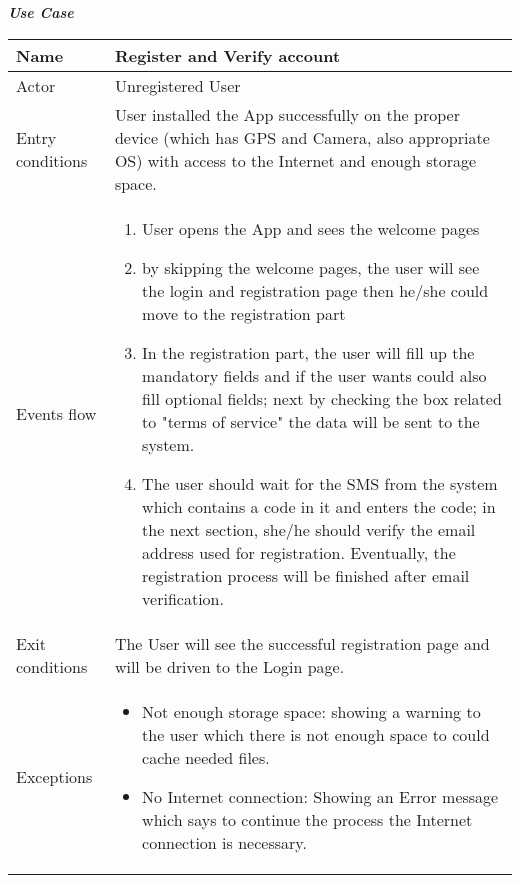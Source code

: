 

\begin{table}[H]
\begin{flushleft}\emph{\textbf{Use Case}}\end{flushleft}
\footnotesize
\centering
\settowidth{}
\setlength\extrarowheight{2pt}
\begin{tabulary}{\textwidth}{|J|J|}
\hline
Name             & Register and Verify account \\
\hline 
Actor            & Unregistered User \\
\hline 
Entry conditions & User installed the App successfully on the proper device (which has GPS and Camera, also appropriate OS) with access to the Internet and enough storage space.\\
\hline 
Events flow      & 
\begin{minipage}[t]{0.6\textwidth}
\begin{enumerate} 
\item User opens the App and sees the welcome pages 
\item by skipping the welcome pages, the user will see the login and registration page then he/she could move to the registration part
\item In the registration part, the user will fill up the mandatory fields and if the user wants could also   fill optional fields; next by checking the box related to "terms of service" the data will be sent to the system.
\item The user should wait for the SMS from the system which contains a code in it and enters the code; in the next section, she/he should verify the email address used for registration. Eventually, the registration process will be finished after email verification.
\end{enumerate}
\end{minipage}\\
\hline
Exit conditions  & The User will see the successful registration page and will be driven to the Login page.\\
\hline
Exceptions       & 
\begin{minipage}[t]{0.6\textwidth}
\begin{itemize} 
\item Not enough storage space: showing a warning to the user which there is not enough space to could cache  needed files.
\item No Internet connection: Showing an Error message which says to continue the process the Internet   connection is necessary.

\end{itemize}
\end{minipage}
\end{tabulary}
\end{table}
